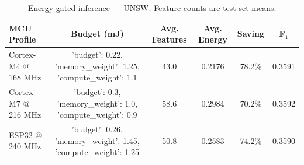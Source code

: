 \begin{table}[t]
\caption{Energy-gated inference — UNSW. Feature counts are test-set means.}
\label{tab:energy_unsw}
\centering
\begin{tabular}{lccccc}
\toprule
MCU Profile & Budget (mJ) & Avg. Features & Avg. Energy & Saving & F$_1$ \\
\midrule
Cortex-M4 @ 168 MHz & {'budget': 0.22, 'memory_weight': 1.25, 'compute_weight': 1.1} & 43.0 & 0.2176 & 78.2\% & 0.3591 \\
Cortex-M7 @ 216 MHz & {'budget': 0.3, 'memory_weight': 1.0, 'compute_weight': 0.9} & 58.6 & 0.2984 & 70.2\% & 0.3592 \\
ESP32 @ 240 MHz & {'budget': 0.26, 'memory_weight': 1.45, 'compute_weight': 1.25} & 50.8 & 0.2583 & 74.2\% & 0.3590 \\
\bottomrule
\end{tabular}
\end{table}